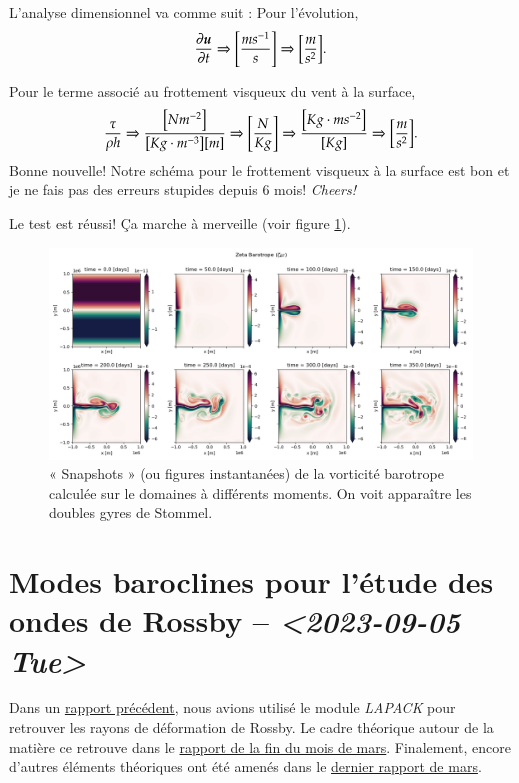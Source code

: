 \documentclass[10pt]{article}
\numberwithin{equation}{section}
\newcommand{\uu}{\vb*{u}}
\begin{document}
L'analyse dimensionnel va comme suit : Pour l'évolution,
\begin{equation}
   \pdv{\uu}{t} \Rightarrow \qty[ \frac{ms^{-1}}{s}] \Rightarrow \qty[\frac{m}{s^2}]. 
\end{equation}

Pour le terme associé au frottement visqueux du vent à la surface,
\begin{equation}
   \frac{\tau}{\rho h} \Rightarrow \frac{\qty[N m^{-2}]}{\qty[Kg\cdot m^{-3}] \qty[m]} \Rightarrow \qty[\frac{N}{Kg}] \Rightarrow \frac{\qty[Kg \cdot m s^{-2}]}{[Kg]} \Rightarrow \qty[\frac{m}{s^2}].
\end{equation}
Bonne nouvelle! Notre schéma pour le frottement visqueux à la surface est bon et je ne fais pas des erreurs stupides depuis 6 mois! \emph{Cheers!} \bigskip

Le test est réussi! Ça marche à merveille (voir figure \ref{fig:org5b37004}).

\begin{figure}[htbp]
\centering
\includegraphics[width=.9\linewidth]{figures/tests/2023-09-06_8panneaux_zetaBT.png}
\caption{\label{fig:org5b37004}« Snapshots » (ou figures instantanées) de la vorticité barotrope calculée sur le domaines à différents moments. On voit apparaître les doubles gyres de Stommel.}
\end{figure}

\section{Modes baroclines pour l'étude des ondes de Rossby -- \textit{<2023-09-05 Tue>}}
\label{sec:org2d01df6}

Dans un \href{rapport-2023-04-07.pdf}{rapport précédent}, nous avions utilisé le module \emph{LAPACK} pour retrouver les rayons de déformation de Rossby.
Le cadre théorique autour de la matière ce retrouve dans le \href{rapport-2023-03-24.pdf}{rapport de la fin du mois de mars}.
Finalement, encore d'autres éléments théoriques ont été amenés dans le \href{rapport-2023-03-31.pdf}{dernier rapport de mars}.\bigskip
\end{document}
